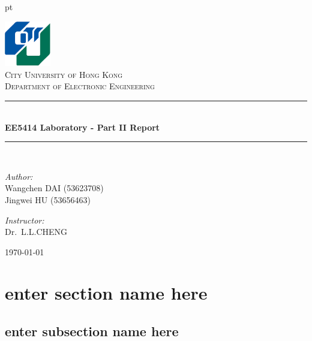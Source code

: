 \documentclass[12pt,journal,draftclsnofoot,onecolumn]{IEEEtran}
\begin{document}

 pt

\begin{titlepage}

\begin{center}


\includegraphics[width=0.15\textwidth]{./figs/logo.png}\\[1cm]    

\textsc{\LARGE City University of Hong Kong}\\[1.5cm]

\textsc{\Large Department  of Electronic Engineering}\\[0.5cm]


\rule{0.9\textwidth}{1pt}\\[0.4cm]
{ \huge \bfseries EE5414 Laboratory - Part II Report}\\[0.4cm]
\rule{0.9\textwidth}{1pt}\\[1.5cm]


\begin{minipage}[t]{0.4\textwidth}
\begin{flushleft} \large
\emph{Author:}\\
Wangchen \textsc{DAI} (53623708)\\
Jingwei \textsc{HU} (53656463)\\
\end{flushleft}
\end{minipage}
\begin{minipage}[t]{0.4\textwidth}
\begin{flushright} \large
\emph{Instructor:} \\
Dr.~L.L.\textsc{CHENG}  
\end{flushright}
\end{minipage}

\vfill

{\large \today}

\end{center}

\end{titlepage}

\clearpage

\section{enter section name here}\label{Label}
   \subsection{enter subsection name here}

%
%
\clearpage
\end{document}
